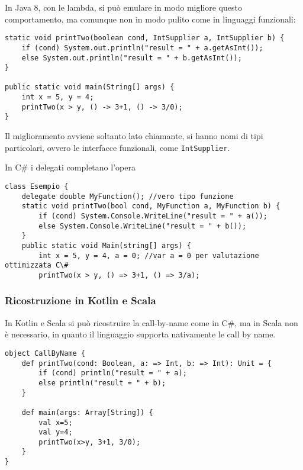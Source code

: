 In Java 8, con le lambda, si può emulare in modo migliore questo comportamento, ma comunque non in modo pulito come in linguaggi funzionali:
\begin{verbatim}
static void printTwo(boolean cond, IntSupplier a, IntSupplier b) {
    if (cond) System.out.println("result = " + a.getAsInt());
    else System.out.println("result = " + b.getAsInt());
}

public static void main(String[] args) {
    int x = 5, y = 4;
    printTwo(x > y, () -> 3+1, () -> 3/0);
}
\end{verbatim}
Il miglioramento avviene soltanto lato chiamante, si hanno nomi di tipi particolari, ovvero le interfacce funzionali, come \texttt{IntSupplier}.


In C\# i delegati completano l'opera
\begin{verbatim}
class Esempio {
    delegate double MyFunction(); //vero tipo funzione
    static void printTwo(bool cond, MyFunction a, MyFunction b) {
        if (cond) System.Console.WriteLine("result = " + a());
        else System.Console.WriteLine("result = " + b());
    }
    public static void Main(string[] args) {
        int x = 5, y = 4, a = 0; //var a = 0 per valutazione ottimizzata C\#
        printTwo(x > y, () => 3+1, () => 3/a);
\end{verbatim}

\subsubsection{Ricostruzione in Kotlin e Scala}
In Kotlin e Scala si può ricostruire la call-by-name come in C\#, ma in Scala non è necessario, in quanto il linguaggio supporta nativamente le call by name.

\begin{verbatim}
object CallByName {
    def printTwo(cond: Boolean, a: => Int, b: => Int): Unit = {
        if (cond) println("result = " + a);
        else println("result = " + b);
    }
    
    def main(args: Array[String]) {
        val x=5;
        val y=4;
        printTwo(x>y, 3+1, 3/0);
    }
}
\end{verbatim}
